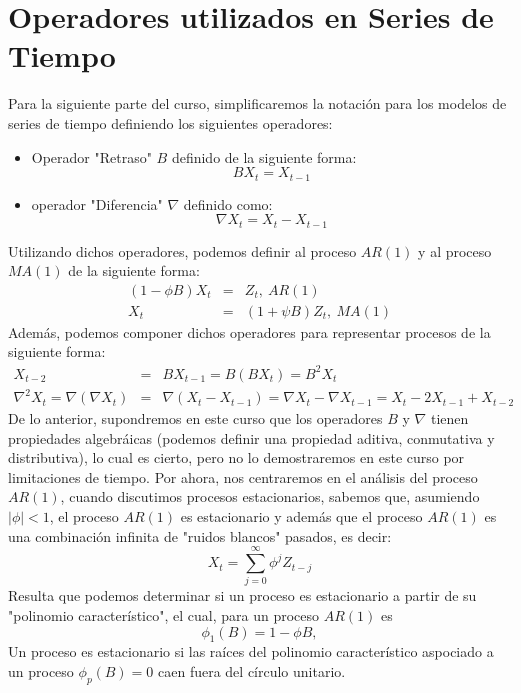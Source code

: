 \documentclass[10pt,a4paper]{article}
\begin{document}
\section{Operadores utilizados en Series de Tiempo}
Para la siguiente parte del curso, simplificaremos la notación para los modelos de series de tiempo definiendo los siguientes operadores:
\begin{itemize}
	\item Operador "Retraso" $B$ definido de la siguiente forma:
	\begin{equation}
		B X_t = X_{t-1}
	\end{equation}
	\item operador "Diferencia" $\nabla$ definido como:
		\begin{equation}
			\nabla X_t = X_t - X_{t-1}
		\end{equation} 
\end{itemize}

Utilizando dichos operadores, podemos definir al proceso $AR(1)$ y al proceso $MA(1)$ de la siguiente forma:
\begin{eqnarray}
	(1-\phi B)X_t &=& Z_t , \ AR(1)\\
	X_t &=& (1+\psi B) Z_t, \ MA(1)
\end{eqnarray}
Además, podemos componer dichos operadores para representar procesos de la siguiente forma:
\begin{eqnarray}
	X_{t-2} &=& B X_{t-1} = B(B X_{t}) = B ^{2}X_t \\
	\nabla ^{2} X_t = \nabla (\nabla X_t) &=& \nabla (X_t - X_{t-1}) = \nabla X_t - \nabla X_{t-1} = X_t - 2 X_{t-1}+ X_{t-2}
\end{eqnarray}
De lo anterior, supondremos en este curso que los operadores $B$ y $\nabla$ tienen propiedades algebráicas (podemos definir una propiedad aditiva, conmutativa y distributiva), lo cual es cierto, pero no lo demostraremos en este curso por limitaciones de tiempo. 
Por ahora, nos centraremos en el análisis del proceso $AR(1)$, cuando discutimos procesos estacionarios, sabemos que, asumiendo $|\phi| < 1$, el proceso $AR(1)$ es estacionario y además que el proceso $AR(1)$ es una combinación infinita de "ruidos blancos" pasados, es decir:
\begin{equation}
	X_t = \sum_{j = 0}^{\infty} \phi^j Z_{t-j}
\end{equation} 
 Resulta que podemos determinar si un proceso es estacionario a partir de su "polinomio característico", el cual, para un proceso $AR(1)$ es \begin{equation}
 	\phi_1(B) = 1- \phi B,
 \end{equation}
Un proceso es estacionario si las raíces del polinomio característico aspociado a un proceso $\phi_p(B) =0$ caen fuera del círculo unitario.
\end{document}
